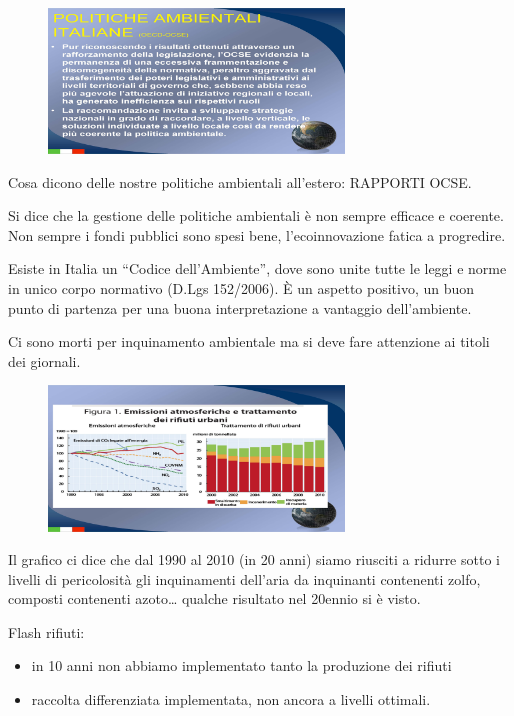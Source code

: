 \begin{figure}[!ht]
\centering
	\includegraphics[width=0.7\textwidth]{22/image3.jpeg}
	\end{figure}

Cosa
dicono delle nostre politiche ambientali all'estero: RAPPORTI OCSE.

Si dice che la gestione delle politiche ambientali è non sempre efficace
e coerente. Non sempre i fondi pubblici sono spesi bene,
l'ecoinnovazione fatica a progredire.

Esiste in Italia un ``Codice dell'Ambiente'', dove sono unite tutte le
leggi e norme in unico corpo normativo (D.Lgs 152/2006). È un aspetto
positivo, un buon punto di partenza per una buona interpretazione a
vantaggio dell'ambiente.

Ci sono morti per inquinamento ambientale ma si deve fare attenzione ai
titoli dei
giornali.

\begin{figure}[!ht]
\centering
	\includegraphics[width=0.7\textwidth]{22/image4.jpeg}
	\end{figure}

Il
grafico ci dice che dal 1990 al 2010 (in 20 anni) siamo riusciti a
ridurre sotto i livelli di pericolosità gli inquinamenti dell'aria da
inquinanti contenenti zolfo, composti contenenti azoto\ldots{} qualche
risultato nel 20ennio si è visto.

Flash rifiuti:

\begin{itemize}
\item
  in 10 anni non abbiamo implementato tanto la produzione dei rifiuti
\item
  raccolta differenziata implementata, non ancora a livelli ottimali.
\end{itemize}

